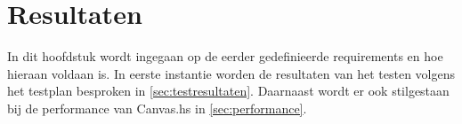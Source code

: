 \chapter{Resultaten} \label{hoofdstuk:resultaten}
In dit hoofdstuk wordt ingegaan op de eerder gedefinieerde requirements en hoe hieraan voldaan is. In eerste instantie worden de resultaten van het testen volgens het testplan besproken in \autoref{sec:testresultaten}. Daarnaast wordt er ook stilgestaan bij de performance van Canvas.hs in \autoref{sec:performance}.

